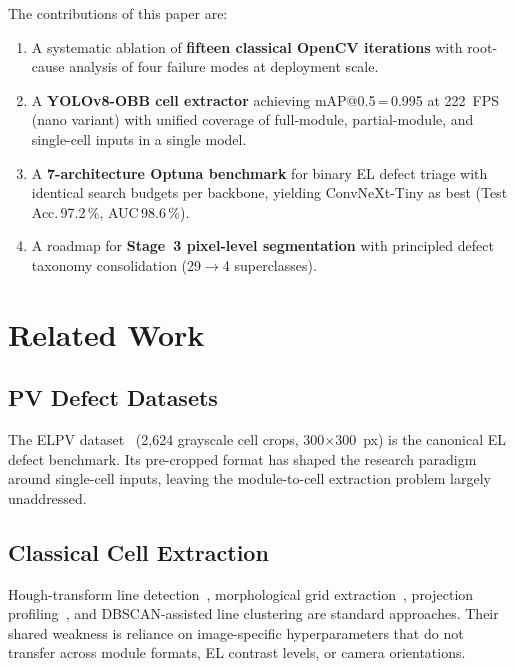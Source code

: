 \documentclass[conference]{IEEEtran}
\begin{document}
The contributions of this paper are:
\begin{enumerate}
  \item A systematic ablation of \textbf{fifteen classical
        OpenCV iterations} with root-cause analysis of four
        failure modes at deployment scale.
  \item A \textbf{YOLOv8-OBB cell extractor} achieving
        mAP@0.5\,=\,0.995 at 222~FPS (nano variant) with
        unified coverage of full-module, partial-module, and
        single-cell inputs in a single model.
  \item A \textbf{7-architecture Optuna benchmark} for binary
        EL defect triage with identical search budgets per
        backbone, yielding ConvNeXt-Tiny as best
        (Test Acc.\,97.2\,\%, AUC\,98.6\,\%).
  \item A roadmap for \textbf{Stage~3 pixel-level
        segmentation} with principled defect taxonomy
        consolidation (29$\to$4 superclasses).
\end{enumerate}

\section{Related Work}
\label{sec:related}

\subsection{PV Defect Datasets}
The ELPV dataset~\cite{deitsch2019} (2{,}624 grayscale cell
crops, 300$\times$300~px) is the canonical EL defect
benchmark. Its pre-cropped format has shaped the research
paradigm around single-cell inputs, leaving the
module-to-cell extraction problem largely unaddressed.

\subsection{Classical Cell Extraction}
Hough-transform line detection~\cite{duda1972}, morphological
grid extraction~\cite{soille2003}, projection
profiling~\cite{wong1982}, and DBSCAN-assisted line clustering
are standard approaches. Their shared weakness is reliance on
image-specific hyperparameters that do not transfer across
module formats, EL contrast levels, or camera orientations.
\end{document}
